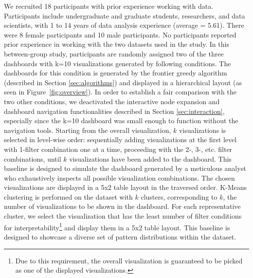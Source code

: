We recruited 18 participants with prior experience working with data. Participants include undergraduate and graduate students, researchers, and data scientists, with 1 to 14 years of data analysis experience (average = 5.61).  %
There were 8 female participants and 10 male participants. No participants reported prior experience in working with the two datasets used in the study. In this between-group study, participants are randomly assigned two of the three dashboards with k=10 visualizations generated by following conditions. 
\stitle{\system:} The dashboards for this condition is generated by the frontier greedy algorithm (described in Section \ref{sec:algorithms}) and displayed in a hierarchical layout (as seen in Figure~\ref{fig:overview}). In order to establish a fair comparison with the two other conditions, we deactivated the interactive node expansion and dashboard navigation functionalities described in Section \ref{sec:interaction}, especially since the k=10 dashboard was small enough to function without the navigation tools.
\stitle{\BFS:} Starting from the overall visualization, $k$ visualizations is selected in level-wise order: sequentially adding visualizations at the first level with 1-filter combination one at a time, proceeding with the 2-, 3-, etc. filter combinations, until $k$ visualizations have been added to the dashboard. This baseline is designed to simulate the dashboard generated by a meticulous analyst who exhaustively inspects all possible visualization combinations. The chosen visualizations are displayed in a 5x2 table layout in the traversed order.
\stitle{\cluster:} K-Means clustering is performed on the dataset with $k$ clusters, corresponding to $k$, the number of visualizations to be shown in the dashboard. For each representative cluster, we select the visualization that has the least number of filter conditions for interpretability\footnote{Due to this requirement, the overall visualization is guaranteed to be picked as one of the displayed visualizations.} and display them in a 5x2 table layout. This baseline is designed to showcase a diverse set of pattern distributions within the dataset.

